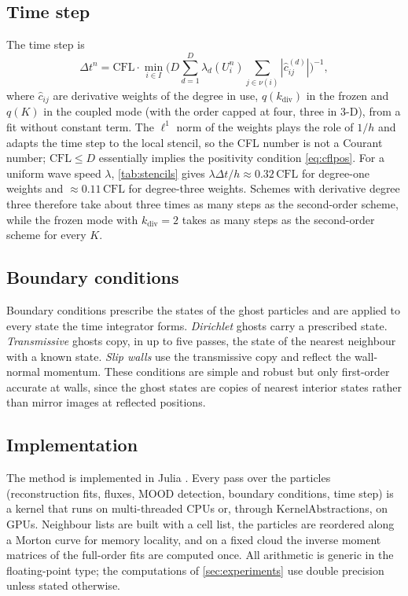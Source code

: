 \documentclass[11pt,a4paper]{article}
\numberwithin{equation}{section}
\newcommand{\nb}{\nu}
\newcommand{\qdiv}{q}
\newcommand{\CFL}{\mathrm{CFL}}
\begin{document}
\subsection{Time step}\label{sec:timestep}

The time step is
\begin{equation}\label{eq:cfl}
\Delta t^n = \CFL\cdot\min_{i\in I}\Big(D\sum_{d=1}^D\lambda_d(U^n_i)\sum_{j\in\nb(i)}|\hat c^{(d)}_{ij}|\Big)^{-1},
\end{equation}
where $\hat c_{ij}$ are derivative weights of the degree in use, $\qdiv(k_{\mathrm{div}})$ in the frozen and $\qdiv(K)$ in the coupled mode (with the order capped at four, three in 3-D), from a fit without constant term. The $\ell^1$ norm of the weights plays the role of $1/h$ and adapts the time step to the local stencil, so the CFL number is not a Courant number; $\CFL\le D$ essentially implies the positivity condition \eqref{eq:cflpos}. For a uniform wave speed $\lambda$, \cref{tab:stencils} gives $\lambda\Delta t/h\approx0.32\,\CFL$ for degree-one weights and $\approx0.11\,\CFL$ for degree-three weights. Schemes with derivative degree three therefore take about three times as many steps as the second-order scheme, while the frozen mode with $k_{\mathrm{div}}=2$ takes as many steps as the second-order scheme for every $K$.

\subsection{Boundary conditions}\label{sec:bc}

Boundary conditions prescribe the states of the ghost particles and are applied to every state the time integrator forms. \emph{Dirichlet} ghosts carry a prescribed state. \emph{Transmissive} ghosts copy, in up to five passes, the state of the nearest neighbour with a known state. \emph{Slip walls} use the transmissive copy and reflect the wall-normal momentum. These conditions are simple and robust but only first-order accurate at walls, since the ghost states are copies of nearest interior states rather than mirror images at reflected positions.

\subsection{Implementation}\label{sec:implementation}

The method is implemented in Julia \cite{jung_hypercloudcore,jung_hypercloud}. Every pass over the particles (reconstruction fits, fluxes, MOOD detection, boundary conditions, time step) is a kernel that runs on multi-threaded CPUs or, through KernelAbstractions, on GPUs. Neighbour lists are built with a cell list, the particles are reordered along a Morton curve for memory locality, and on a fixed cloud the inverse moment matrices of the full-order fits are computed once. All arithmetic is generic in the floating-point type; the computations of \cref{sec:experiments} use double precision unless stated otherwise.
\end{document}
